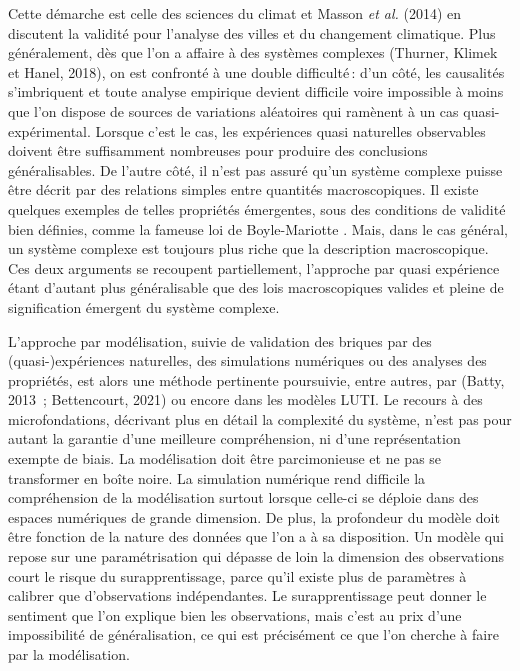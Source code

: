 \documentclass[
  9pt,
  a4paper,
  DIV=11]{scrreprt}
\begin{document}
Cette démarche est celle des sciences du climat et Masson \emph{et al.}
(2014) en discutent la validité pour l'analyse des villes et du
changement climatique. Plus généralement, dès que l'on a affaire à des
systèmes complexes (Thurner, Klimek et Hanel, 2018), on est confronté à
une double difficulté\,: d'un côté, les causalités s'imbriquent et toute
analyse empirique devient difficile voire impossible à moins que l'on
dispose de sources de variations aléatoires qui ramènent à un cas
quasi-expérimental. Lorsque c'est le cas, les expériences quasi
naturelles observables doivent être suffisamment nombreuses pour
produire des conclusions généralisables. De l'autre côté, il n'est pas
assuré qu'un système complexe puisse être décrit par des relations
simples entre quantités macroscopiques. Il existe quelques exemples de
telles propriétés émergentes, sous des conditions de validité bien
définies, comme la fameuse loi de Boyle-Mariotte . Mais, dans le cas
général, un système complexe est toujours plus riche que la description
macroscopique. Ces deux arguments se recoupent partiellement, l'approche
par quasi expérience étant d'autant plus généralisable que des lois
macroscopiques valides et pleine de signification émergent du système
complexe.

L'approche par modélisation, suivie de validation des briques par des
(quasi-)expériences naturelles, des simulations numériques ou des
analyses des propriétés, est alors une méthode pertinente poursuivie,
entre autres, par (Batty, 2013~; Bettencourt, 2021) ou encore dans les
modèles LUTI. Le recours à des microfondations, décrivant plus en détail
la complexité du système, n'est pas pour autant la garantie d'une
meilleure compréhension, ni d'une représentation exempte de biais. La
modélisation doit être parcimonieuse et ne pas se transformer en boîte
noire. La simulation numérique rend difficile la compréhension de la
modélisation surtout lorsque celle-ci se déploie dans des espaces
numériques de grande dimension. De plus, la profondeur du modèle doit
être fonction de la nature des données que l'on a à sa disposition. Un
modèle qui repose sur une paramétrisation qui dépasse de loin la
dimension des observations court le risque du surapprentissage, parce
qu'il existe plus de paramètres à calibrer que d'observations
indépendantes. Le surapprentissage peut donner le sentiment que l'on
explique bien les observations, mais c'est au prix d'une impossibilité
de généralisation, ce qui est précisément ce que l'on cherche à faire
par la modélisation.
\end{document}
